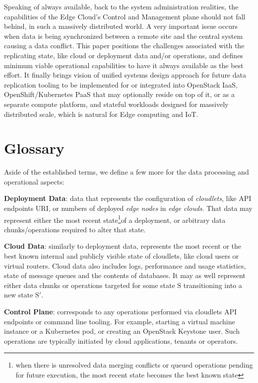 \documentclass[conference]{IEEEtran}
\begin{document}
Speaking of always available, back to the system administration realities, the
capabilities of the Edge Cloud's Control and Management plane should not fall
behind, in such a massively distributed world. A very important issue occurs when 
data is being synchronized between a remote site and the central system causing a
data conflict. This paper positions the challenges associated with the 
replicating state, like cloud or deployment data and/or operations, and defines 
minimum viable operational capabilities to have it always available as the best
effort. It finally brings vision of unified systems design approach for future
data replication tooling to be implemented for or integrated into OpenStack IaaS,
OpenShift/Kubernetes PaaS that may optionally reside on top of it, or as a separate
compute platform, and stateful workloads designed for massively distributed scale,
which is natural for Edge computing and IoT.

\section{Glossary}

Aside of the established terms\cite{b3}, we define a few more for the data
processing and operational aspects:

\textbf{Deployment Data}: data that represents the configuration of
\textit{cloudlets}\cite{b3}, like API endpoints URI, or numbers of deployed
\textit{edge nodes}\cite{b3} in \textit{edge clouds}\cite{b3}. That data may
represent either the most recent state\footnote{when there is unresolved data
merging conflicts or queued operations pending for future execution, the most
recent state becomes the best known state}of a deployment, or arbitrary data
chunks/operations required to alter that state.

\textbf{Cloud Data}: similarly to deployment data, represents the most recent
or the best known internal and publicly visible state of cloudlets, like cloud
users or virtual routers. Cloud data also includes logs, performance and usage
statistics, state of message queues and the contents of databases. It may as
well represent either data chunks or operations targeted for some state
$\mathrm{S}$ transitioning into a new state $\mathrm{S'}$.

\textbf{Control Plane}: corresponds to any operations performed via cloudlets
API endpoints or command line tooling. For example, starting a virtual machine
instance or a Kubernetes pod, or creating an OpenStack Keystone user. Such
operations are typically initiated by cloud applications, tenants or operators.
\end{document}
